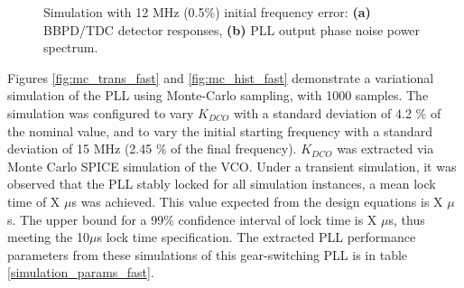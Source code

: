 \begin{figure}[htb!]
\begin{subfigure}{0.5\textwidth}
			        \caption{ }
			        \label{fig:trans_phase_noise_fast}
			    \end{subfigure}
			    \label{fig:trans_sim2_fast}
			    \caption{Simulation with 12 MHz (0.5\%) initial frequency error: \textbf{(a)} BBPD/TDC detector responses, \textbf{(b)} PLL output phase noise power spectrum.}
			\end{figure}

		\FloatBarrier
		Figures \ref{fig:mc_trans_fast} and \ref{fig:mc_hist_fast} demonstrate a variational simulation of the PLL using Monte-Carlo sampling, with 1000 samples. The simulation was configured to vary $K_{DCO}$ with a standard deviation of 4.2 \% of the nominal value, and to vary the initial starting frequency with a standard deviation of 15 MHz (2.45 \% of the final frequency). $K_{DCO}$ was extracted via Monte Carlo SPICE simulation of the VCO. Under a transient simulation, it was observed that the PLL stably locked for all simulation instances, a mean lock time of X $\mu$s was achieved. This value expected from the design equations is X $\mu$s. The upper bound for a 99\% confidence interval of lock time is X $\mu$s, thus meeting the 10$\mu$s lock time specification. The extracted PLL performance parameters from these simulations of this gear-switching PLL is in table \ref{simulation_params_fast}. 

